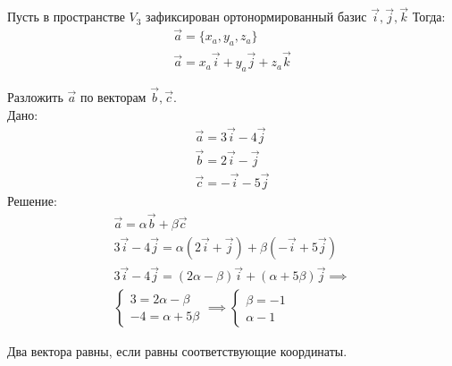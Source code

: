 \begin{eg}
  Пусть в пространстве $V_3$ зафиксирован ортонормированный базис $\vec{i}, \vec{j}, \vec{k}$
  Тогда:
  \begin{gather*}
    \vec{a} = \{x_a, y_a, z_a\} \\
    \vec{a} = x_a \vec{i} + y_a \vec{j} + z_a \vec{k}
  \end{gather*}
\end{eg}

\exercise{}
Разложить $\vec{a}$ по векторам $\vec{b}, \vec{c}$. \\
Дано:
\begin{gather*}
  \vec{a} = 3 \vec{i} - 4 \vec{j} \\
  \vec{b} = 2 \vec{i} -   \vec{j} \\
  \vec{c} = - \vec{i} - 5 \vec{j}
\end{gather*}
Решение:
\begin{gather*}
  \vec{a} = \alpha \vec{b} + \beta \vec{c} \\
  3 \vec{i} - 4 \vec{j} = \alpha(2 \vec{i} + \vec{j}) + \beta (- \vec{i} + 5 \vec{j}) \\
  3 \vec{i} - 4 \vec{j} = (2 \alpha - \beta) \vec{i} + (\alpha + 5 \beta) \vec{j} \implies \\
  \begin{cases}
    3 = 2 \alpha - \beta \\
    -4 = \alpha + 5 \beta
  \end{cases} 
  \implies 
  \begin{cases}
    \beta = -1 \\
    \alpha - 1
  \end{cases}
\end{gather*}

\begin{note}
  Два вектора равны, если равны соответствующие координаты.
\end{note}

